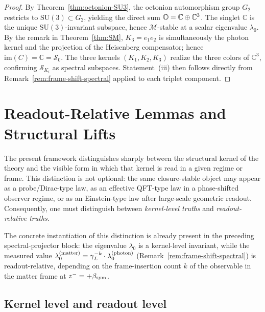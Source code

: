 \begin{proof}
By Theorem~\ref{thm:octonion-SU3}, the octonion automorphism group $G_2$
restricts to $\mathrm{SU}(3)\subset G_2$, yielding the direct sum
$\mathbb{O} = \mathbb{C}\oplus\mathbb{C}^3$. The singlet $\mathbb{C}$ is the
unique $\mathrm{SU}(3)$-invariant subspace, hence $\mathcal{M}$-stable at
a scalar eigenvalue $\lambda_0$. By the remark in
Theorem~\ref{thm:SM}, $K_3 = e_1 e_2$ is simultaneously the photon kernel
and the projection of the Heisenberg compensator; hence
$\mathrm{im}(C) = \mathbb{C} = \mathcal{S}_0$. The three kernels
$(K_1,K_2,K_3)$ realize the three colors of $\mathbb{C}^3$, confirming
$\mathcal{S}_{K_i}$ as spectral subspaces. Statement~(iii) then follows
directly from Remark~\ref{rem:frame-shift-spectral} applied to each
triplet component.
\end{proof}


\section{Readout-Relative Lemmas and Structural Lifts}
\label{sec:readout-relative-lemmas}

The present framework distinguishes sharply between the structural kernel
of the theory and the visible form in which that kernel is read in a
given regime or frame. This distinction is not optional: the same
closure-stable object may appear as a probe/Dirac-type law, as an
effective QFT-type law in a phase-shifted observer regime, or as an
Einstein-type law after large-scale geometric readout. Consequently,
one must distinguish between \emph{kernel-level truths} and
\emph{readout-relative truths}.

The concrete instantiation of this distinction is already present in the
preceding spectral-projector block: the eigenvalue $\lambda_0$ is a
kernel-level invariant, while the measured value
$\lambda_0^{(\mathrm{matter})} = \gamma_L^{-k}\cdot\lambda_0^{(\mathrm{photon})}$
(Remark~\ref{rem:frame-shift-spectral}) is readout-relative, depending
on the frame-insertion count $k$ of the observable in the matter frame
at $z^- = +\beta_{\mathrm{sym}}$.

\subsection*{Kernel level and readout level}

